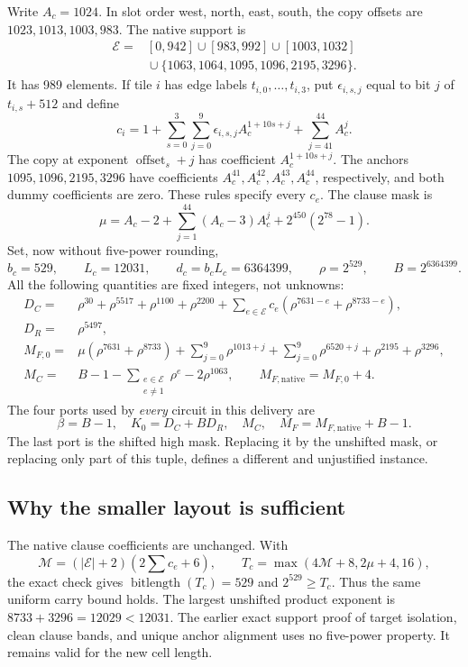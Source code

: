 Write $A_c=1024$.  In slot order west, north, east, south, the copy offsets
are $1023,1013,1003,983$.  The native support is
\begin{align*}
\mathcal E={}&[0,942]\cup[983,992]\cup[1003,1032]\\
 &{}\cup\{1063,1064,1095,1096,2195,3296\}.
\end{align*}
It has 989 elements.  If tile $i$ has edge labels $t_{i,0},\ldots,t_{i,3}$,
put $\epsilon_{i,s,j}$ equal to bit $j$ of $t_{i,s}+512$ and define
\[
 c_i=1+\sum_{s=0}^3\sum_{j=0}^9
          \epsilon_{i,s,j}A_c^{1+10s+j}+\sum_{j=41}^{44}A_c^j.
\]
The copy at exponent $\operatorname{offset}_s+j$ has coefficient
$A_c^{1+10s+j}$.  The anchors $1095,1096,2195,3296$ have coefficients
$A_c^{41},A_c^{42},A_c^{43},A_c^{44}$, respectively, and both dummy
coefficients are zero.  These rules specify every $c_e$.
The clause mask is
\[
 \mu=A_c-2+\sum_{j=1}^{44}(A_c-3)A_c^j+2^{450}(2^{78}-1).
\]
Set, now without five-power rounding,
\[
 b_c=529,\qquad L_c=12031,\qquad d_c=b_cL_c=6364399,
 \qquad \rho=2^{529},\qquad B=2^{6364399}.
\]
All the following quantities are fixed integers, not unknowns:
\begin{align*}
D_C={}&\rho^{30}+\rho^{5517}+\rho^{1100}+\rho^{2200}
       +\sum_{e\in\mathcal E}c_e
                 (\rho^{7631-e}+\rho^{8733-e}),\\
D_R={}&\rho^{5497},\\
M_{F,0}={}&\mu(\rho^{7631}+\rho^{8733})
       +\sum_{j=0}^9\rho^{1013+j}+\sum_{j=0}^9\rho^{6520+j}
       +\rho^{2195}+\rho^{3296},\\
M_C={}&B-1-\sum_{\substack{e\in\mathcal E\\e\ne1}}\rho^e
              -2\rho^{1063},\qquad M_{F,\mathrm{native}}=M_{F,0}+4.
\end{align*}
The four ports used by \emph{every} circuit in this delivery are
\begin{equation}\label{eq:four-ports}
 \boxed{\ \beta=B-1,\quad K_0=D_C+BD_R,\quad
 M_C,\quad M_F=M_{F,\mathrm{native}}+B-1.\ }
\end{equation}
The last port is the shifted high mask.  Replacing it by the unshifted
mask, or replacing only part of this tuple, defines a different and
unjustified instance.

\subsection{Why the smaller layout is sufficient}

The native clause coefficients are unchanged.  With
\[
 \mathcal M=(|\mathcal E|+2)\left(2\sum c_e+6\right),\qquad
 T_c=\max(4\mathcal M+8,2\mu+4,16),
\]
the exact check gives $\operatorname{bitlength}(T_c)=529$ and
$2^{529}\ge T_c$.  Thus the same uniform carry bound holds.
The largest unshifted product exponent is
$8733+3296=12029<12031$.  The earlier exact support proof of target
isolation, clean clause bands, and unique anchor alignment uses no
five-power property.  It remains valid for the new cell length.

